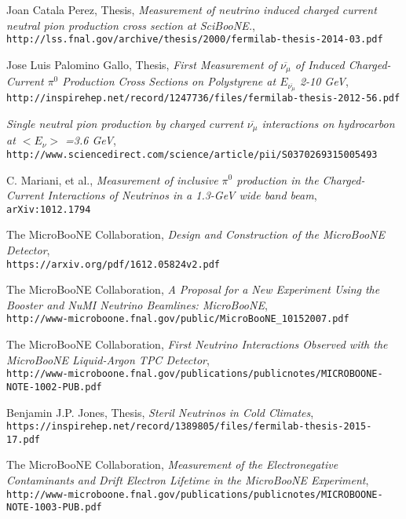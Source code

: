 \documentclass[12pt]{article}
\begin{document}
\begin{thebibliography}{20}
  Joan Catala Perez, Thesis, \emph{Measurement of neutrino induced charged current neutral pion production cross section at SciBooNE.},\\
  \texttt{http://lss.fnal.gov/archive/thesis/2000/fermilab-thesis-2014-03.pdf}  

  Jose Luis Palomino Gallo, Thesis, \emph{First Measurement of $\overline{\nu_\mu}$ of Induced Charged-Current $\pi^0$ Production Cross Sections on Polystyrene at $E_{\overline{\nu_\mu}}$ 2-10 GeV},\\
  \texttt{http://inspirehep.net/record/1247736/files/fermilab-thesis-2012-56.pdf}  
  
   \emph{Single neutral pion production by charged current $\overline{\nu_\mu}$ interactions on hydrocarbon at $< E_\nu >$ =3.6 GeV},\\
  \texttt{http://www.sciencedirect.com/science/article/pii/S0370269315005493}  
  
  C. Mariani, et al., \emph{Measurement of inclusive $\pi^0$ production in the Charged-Current Interactions of Neutrinos in a 1.3-GeV wide band beam},\\
  \texttt{arXiv:1012.1794}

  The MicroBooNE Collaboration, \emph{Design and Construction of the MicroBooNE Detector},\\
  \texttt{https://arxiv.org/pdf/1612.05824v2.pdf}

  The MicroBooNE Collaboration, \emph{A Proposal for a New Experiment Using the Booster and NuMI Neutrino Beamlines: MicroBooNE},\\
  \texttt{http://www-microboone.fnal.gov/public/MicroBooNE\_10152007.pdf}

  The MicroBooNE Collaboration, \emph{First Neutrino Interactions Observed with the MicroBooNE Liquid-Argon TPC Detector},\\
  \texttt{http://www-microboone.fnal.gov/publications/publicnotes/MICROBOONE-NOTE-1002-PUB.pdf}

  Benjamin J.P. Jones, Thesis, \emph{Steril Neutrinos in Cold Climates},\\
  \texttt{https://inspirehep.net/record/1389805/files/fermilab-thesis-2015-17.pdf}

  The MicroBooNE Collaboration, \emph{Measurement of the Electronegative Contaminants and Drift Electron Lifetime in the MicroBooNE Experiment},\\
  \texttt{http://www-microboone.fnal.gov/publications/publicnotes/MICROBOONE-NOTE-1003-PUB.pdf}


\end{thebibliography}
\end{document}
